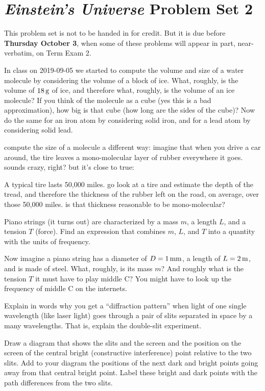 \documentclass[12pt, letterpaper]{article}
\begin{document}
\section*{\textsl{Einstein's Universe} Problem Set 2}

This problem set is not to be handed in for credit. But it is due
before \textbf{Thursday October 3}, when some of these problems
will appear in part, near-verbatim, on Term Exam 2.

\begin{problem}
In class on 2019-09-05 we started to compute the volume and size of a
water molecule by considering the volume of a block of ice. What,
roughly, is the volume of $18\,\mathrm{g}$ of ice, and therefore what,
roughly, is the volume of an ice molecule? If you think of the
molecule as a cube (yes this is a bad approximation), how big is that
cube (how long are the sides of the cube)? Now do the same for an iron
atom by considering solid iron, and for a lead atom by considering
solid lead.
\end{problem}

\begin{problem}
compute the size of a molecule a different way: imagine that when you
drive a car around, the tire leaves a mono-molecular layer of rubber
everywhere it goes. sounds crazy, right? but it's close to true:

A typical tire lasts 50,000 miles. go look at a tire and estimate the
depth of the tread, and therefore the thickness of the rubber left on
the road, on average, over those 50,000 miles. is that thickness
reasonable to be mono-molecular?
\end{problem}

\begin{problem}
Piano strings (it turns out) are characterized by a mass $m$, a length
$L$, and a tension $T$ (force). Find an expression that combines $m$,
$L$, and $T$ into a quantity with the units of frequency.

Now imagine a piano string has a diameter of $D=1\,\mathrm{mm}$, a length of
$L=2\,\mathrm{m}$, and is made of steel. What, roughly, is its mass $m$? And
roughly what is the tension $T$ it must have to play middle C? You
might have to look up the frequency of middle C on the internets.
\end{problem}

\begin{problem}
Explain in words why you get a ``diffraction pattern'' when light of
one single wavelength (like laser light) goes through a pair of slits
separated in space by a many wavelengths. That is, explain the
double-slit experiment.

Draw a diagram that shows the slits and the screen and the position on
the screen of the central bright (constructive interference) point
relative to the two slits. Add to your diagram the positions of the
next dark and bright points going away from that central bright
point. Label these bright and dark points with the path differences
from the two slits.
\end{problem}
\end{document}
